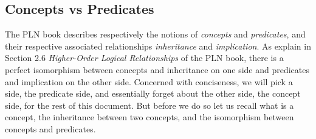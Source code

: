 \documentclass[]{article}
\begin{document}
\subsection{Concepts vs Predicates}
The PLN book describes respectively the notions of \emph{concepts} and
\emph{predicates}, and their respective associated relationships
\emph{inheritance} and \emph{implication}.  As explain in Section 2.6
\emph{Higher-Order Logical Relationships} of the PLN book, there is a
perfect isomorphism between concepts and inheritance on one side and
predicates and implication on the other side.  Concerned with
conciseness, we will pick a side, the predicate side, and essentially
forget about the other side, the concept side, for the rest of this
document.  But before we do so let us recall what is a concept, the
inheritance between two concepts, and the isomorphism between concepts
and predicates.
\end{document}
